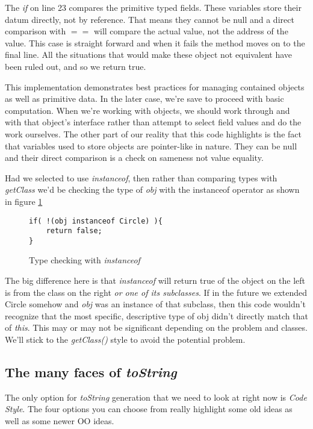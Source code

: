 \documentclass[]{tufte-handout}
\begin{document}
The \textit{if} on line 23 compares the primitive typed fields. These variables store their datum directly, not by reference. That means they cannot be null and a direct comparison with $==$ will compare the actual value, not the address of the value. This case is straight forward and when it fails the method moves on to the final line. All the situations that would make these object not equivalent have been ruled out, and so we return true.

This implementation demonstrates best practices for managing contained objects as well as primitive data. In the later case, we're save to proceed with basic computation. When we're working with objects, we should work through and with that object's interface rather than attempt to select field values and do the work ourselves. The other part of our reality that this code highlights is the fact that variables used to store objects are pointer-like in nature. They can be null and their direct comparison is a check on sameness not value equality. 

Had we selected to use \textit{instanceof}, then rather than comparing types with \textit{getClass} we'd be checking the type of \textit{obj} with the instanceof operator as shown in figure \ref{fig:instanceof}
\begin{figure}
\begin{lstlisting}
if( !(obj instanceof Circle) ){
	return false;
}
\end{lstlisting}
\label{fig:instanceof}
\caption{Type checking with \textit{instanceof}}
\end{figure}
The big difference here is that \textit{instanceof} will return true of the object on the left is from the class on the right \textit{or one of its subclasses}. If in the future we extended Circle somehow and \textit{obj} was an instance of that subclass, then this code wouldn't recognize that the most specific, descriptive type of obj didn't directly match that of \textit{this}. This may or may not be significant depending on the problem and classes. We'll stick to the \textit{getClass()} style to avoid the potential problem.

\subsection*{The many faces of \textit{toString}}

The only option for \textit{toString} generation that we need to look at right now is \textit{Code Style}. The four options you can choose from really highlight some old ideas as well as some newer OO ideas.
\end{document}
